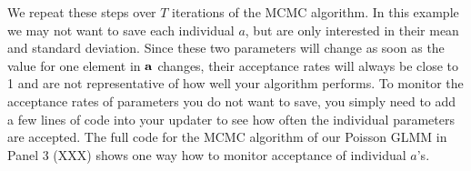 We repeat these steps over $T$ iterations of the MCMC algorithm.
In this example we may not want to save each individual $a$, but are only interested in their mean and standard deviation. Since these two parameters will change as soon as the value for one element in $\bf{a}$ changes, their acceptance rates will always be close to 1 and are not representative of how well your algorithm performs. To monitor the acceptance rates of parameters you do not want to save, you simply need to add a few lines of code into your updater to see how often the individual parameters are accepted. The full code for the MCMC algorithm of our Poisson GLMM in Panel 3 (XXX) shows one way how to monitor acceptance of individual $a$'s.

